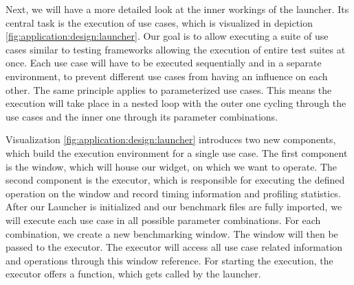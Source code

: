 Next, we will have a more detailed look at the inner workings of the launcher.
Its central task is the execution of use cases, which is visualized in depiction
\ref{fig:application:design:launcher}. Our goal is to allow executing a suite of
use cases similar to testing frameworks allowing the execution of entire test
suites at once. Each use case will have to be executed sequentially and in a
separate environment, to prevent different use cases from having an influence on each
other.  The same principle applies to parameterized use cases. This means the
execution will take place in a nested loop with the outer one cycling through
the use cases and the inner one through its parameter combinations.

Visualization \ref{fig:application:design:launcher} introduces two new
components, which build the execution environment for a single use case. The
first component is the window, which will house our widget, on which we want to
operate. The second component is the executor, which is responsible for
executing the defined operation on the window and record timing information and
profiling statistics. After our Launcher is initialized and our benchmark files
are fully imported, we will execute each use case in all possible parameter
combinations. For each combination, we create a new benchmarking window. The
window will then be passed to the executor. The executor will access all use
case related information and operations through this window reference. For
starting the execution, the executor offers a 
function, which gets called by the launcher.

